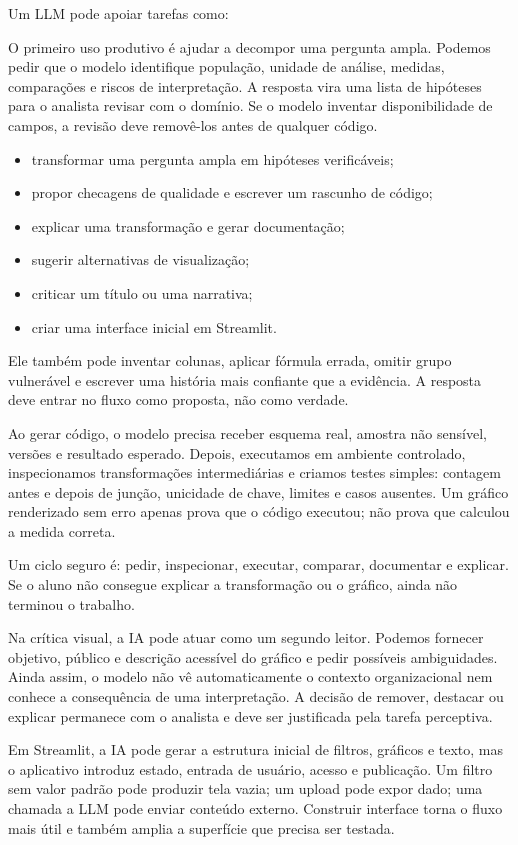 Um LLM pode apoiar tarefas como:

O primeiro uso produtivo é ajudar a decompor uma pergunta ampla. Podemos pedir que o modelo identifique população, unidade de análise, medidas, comparações e riscos de interpretação. A resposta vira uma lista de hipóteses para o analista revisar com o domínio. Se o modelo inventar disponibilidade de campos, a revisão deve removê-los antes de qualquer código.

\begin{itemize}[leftmargin=*]
  \item transformar uma pergunta ampla em hipóteses verificáveis;
  \item propor checagens de qualidade e escrever um rascunho de código;
  \item explicar uma transformação e gerar documentação;
  \item sugerir alternativas de visualização;
  \item criticar um título ou uma narrativa;
  \item criar uma interface inicial em Streamlit.
\end{itemize}

Ele também pode inventar colunas, aplicar fórmula errada, omitir grupo vulnerável e escrever uma história mais confiante que a evidência. A resposta deve entrar no fluxo como proposta, não como verdade.

Ao gerar código, o modelo precisa receber esquema real, amostra não sensível, versões e resultado esperado. Depois, executamos em ambiente controlado, inspecionamos transformações intermediárias e criamos testes simples: contagem antes e depois de junção, unicidade de chave, limites e casos ausentes. Um gráfico renderizado sem erro apenas prova que o código executou; não prova que calculou a medida correta.

Um ciclo seguro é: pedir, inspecionar, executar, comparar, documentar e explicar. Se o aluno não consegue explicar a transformação ou o gráfico, ainda não terminou o trabalho.

Na crítica visual, a IA pode atuar como um segundo leitor. Podemos fornecer objetivo, público e descrição acessível do gráfico e pedir possíveis ambiguidades. Ainda assim, o modelo não vê automaticamente o contexto organizacional nem conhece a consequência de uma interpretação. A decisão de remover, destacar ou explicar permanece com o analista e deve ser justificada pela tarefa perceptiva.

Em Streamlit, a IA pode gerar a estrutura inicial de filtros, gráficos e texto, mas o aplicativo introduz estado, entrada de usuário, acesso e publicação. Um filtro sem valor padrão pode produzir tela vazia; um upload pode expor dado; uma chamada a LLM pode enviar conteúdo externo. Construir interface torna o fluxo mais útil e também amplia a superfície que precisa ser testada.

